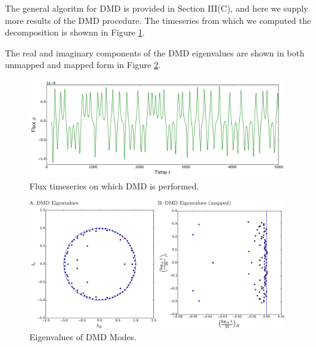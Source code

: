 The general algoritm for DMD is provided in Section III(C), and here we supply more results of the DMD procedure.
The timeseries from which we computed the decomposition is shownn in Figure \ref{fig:DMD-timeseries}.

The real and imaginary components of the DMD eigenvalues are shown in both unmapped and mapped form in Figure \ref{fig:DMD-eigenvalues}.

\begin{figure}
  \centering
  \includegraphics[width=0.98\textwidth]{../figures/DMD/DMD-data-timeseries-longer-wide.pdf}
  \caption[]{
    Flux timeseries on which DMD is performed.    
  }
  \label{fig:DMD-timeseries}  
\end{figure}

\begin{figure}
  \centering
  \includegraphics[width=0.98\textwidth]{../figures/DMD/eigenvalues-both-labeled.pdf}
  \caption[]{
    Eigenvalues of DMD Modes.
  }
  \label{fig:DMD-eigenvalues}  
\end{figure}


